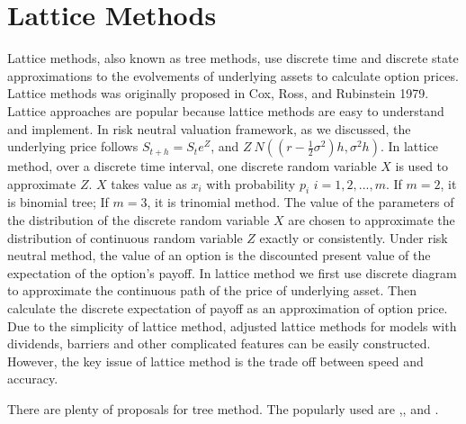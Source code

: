 \documentclass[12pt,oneside,titlepage]{book}
\begin{document}
\section{Lattice Methods}
Lattice methods, also known as tree methods, use discrete time and discrete state approximations to the evolvements of underlying assets to calculate option prices. Lattice methods was originally proposed in
Cox, Ross, and Rubinstein 1979. Lattice approaches are popular because lattice methods are easy to understand and implement. In risk neutral valuation framework, as we discussed, the underlying price follows $S_{t+h} = S_t e^{Z}$, and $Z ~ N((r-\frac{1}{2} \sigma ^2)h,\sigma ^2 h)$. In lattice method, over a discrete time interval, one discrete random variable $X$ is used to approximate $Z$. $X$ takes value as $x_i$ with probability $p_i$ $i=1,2,...,m$. If $m=2$, it is binomial tree; If $m=3$, it is trinomial method. The value of the parameters of the distribution of the discrete random variable $X$ are chosen to approximate the distribution of continuous random variable $Z$ exactly or consistently. Under risk neutral method, the value of an option is the discounted present value of the expectation of the option's payoff. In lattice method we first use discrete diagram to approximate the continuous path of the price of underlying asset. Then calculate the discrete expectation of payoff as an approximation of option price. Due to the simplicity of lattice method, adjusted lattice methods for models with dividends, barriers and other complicated features can be easily constructed. However, the key issue of lattice method is the trade off between speed and accuracy. 

There are plenty of proposals for tree method. The popularly used are \cite{cox1979},\cite{jarrow1983},\cite{Boyle1986} and \cite{Amin1991}. 
\end{document}
